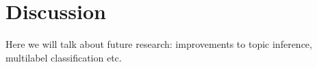 \section{Discussion}
Here we will talk about future research: improvements to topic inference, multilabel classification etc.
